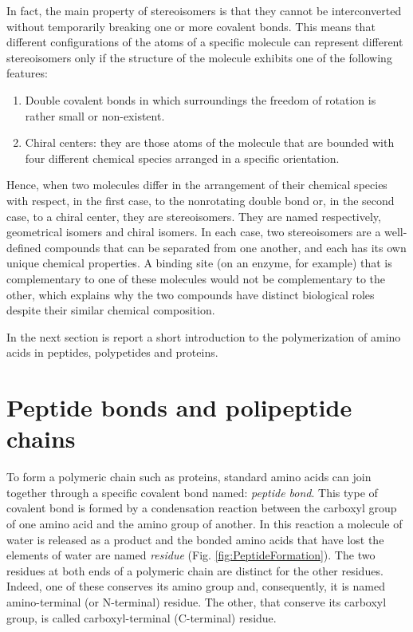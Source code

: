 In fact, the main property of stereoisomers is that they cannot be interconverted without temporarily breaking one or more covalent bonds. This means that different configurations of the atoms of a specific molecule can represent different stereoisomers only if the structure of the molecule exhibits one of the following features:
\begin{enumerate}
\item Double covalent bonds in which surroundings the freedom of rotation is rather small or non-existent.
\item Chiral centers: they are those atoms of the molecule that are bounded with four different chemical species arranged in a specific orientation. 
\end{enumerate}

Hence, when two molecules differ in the arrangement of their chemical species with respect, in the first case, to the nonrotating double bond or, in the second case, to a chiral center, they are stereoisomers. They are named respectively, geometrical isomers and chiral isomers. 
In each case, two stereoisomers are a well-defined compounds that can be separated from one another, and each has its own unique chemical properties. A binding site (on an enzyme, for example) that is complementary to one of these molecules would not be complementary to the other, which explains why the two compounds have distinct biological roles despite their similar chemical composition.

In the next section is report a short introduction to the polymerization of amino acids in peptides, polypetides and proteins.

\section{Peptide bonds and polipeptide chains}\label{sec:peptitde}
To form a polymeric chain such as proteins, standard amino acids can join together through a specific covalent bond named: \textit{peptide bond}. This type of covalent bond is formed by a condensation reaction between the carboxyl group of one amino acid and the amino group of another. In this reaction a molecule of water is released as a product and the bonded amino acids that have lost the elements of water are named \textit{residue} (Fig. \ref{fig:PeptideFormation}). The two residues at both ends of a polymeric chain are distinct for the other residues.
Indeed, one of these conserves its amino group and, consequently, it is named amino-terminal (or N-terminal) residue. The other, that conserve its carboxyl group, is called carboxyl-terminal (C-terminal) residue. 

